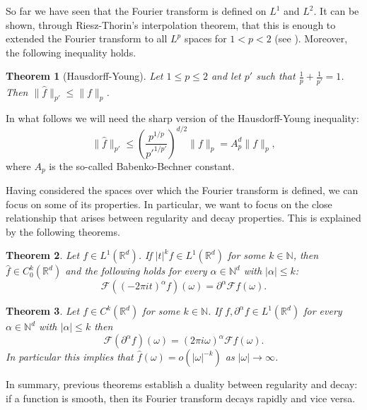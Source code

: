 \documentclass[corpo=11pt, stile=classica, tipotesi=custom,
greek, evenboxes, english]{toptesi}
\numberwithin{equation}{chapter}
\newtheorem{teo}{Theorem}[chapter] %
\theoremstyle{definition}
\theoremstyle{remark}
\newcommand{\R}{\mathbb{R}} %
\newcommand{\N}{\mathbb{N}} %
\newcommand{\F}{\mathscr{F}} %
\begin{document}
So far we have seen that the Fourier transform is defined on $L^1$ and $L^2$. It can be shown, through Riesz-Thorin's interpolation theorem, that this is enough to extended the Fourier transform to all $L^p$ spaces for $1 < p < 2$ (see \cite[][Section 2.2.4]{grafakos}). Moreover, the following inequality holds.
\begin{teo}[Hausdorff-Young]
	Let $1 \leq p \leq 2$ and let $p'$ such that $\frac{1}{p} + \frac{1}{p'} = 1$. Then $\| \hat{f }\|_{p'} \leq \| f \|_p$.
\end{teo}
In what follows we will need the sharp version of the Hausdorff-Young inequality: 
\begin{equation}\label{Hausdorff-Yound inequality}
	\| \hat{f} \|_{p'} \leq \left(\dfrac{p^{1/p}}{p'^{1/p'}}\right)^{d/2} \|f\|_p = A_p^d \|f\|_p,
\end{equation}
where $A_p$ is the so-called Babenko-Bechner constant.

Having considered the spaces over which the Fourier transform is defined, we can focus on some of its properties. In particular, we want to focus on the close relationship that arises between regularity and decay properties. This is explained by the following theorems.
\begin{teo}\label{duality decay-regularity theorem}
	Let $f \in L^1(\R^d)$. If $|t|^k f \in L^1(\R^d)$ for some $k \in \N$, then $\hat{f} \in C_0^k(\R^d)$ and the following holds for every $\alpha \in \N^d$ with $|\alpha| \leq k$:
	\begin{equation}\label{derivative of transform}
		\F \left((-2 \pi i t)^{\alpha} f \right) (\omega) = \partial^{\alpha} \F f(\omega).
	\end{equation}
\end{teo}
\begin{teo}\label{duality regularity-decay theorem}
	Let $f \in C^k(\R^d)$ for some $k \in \N$. If $f, \partial^{\alpha}f \in L^1(\R^d)$ for every $\alpha \in \N^d$ with $|\alpha| \leq k$ then
	\begin{equation}\label{transform of derivative}
		\F \left(\partial^{\alpha} f\right) (\omega) = \left(2 \pi i \omega\right)^{\alpha} \F f(\omega).
	\end{equation}
	In particular this implies that $\hat{f}(\omega) = o\left(|\omega|^{-k} \right) $ as $| \omega | \rightarrow \infty$.
\end{teo}
In summary, previous theorems establish a duality between regularity and decay: if a function is smooth, then its Fourier transform decays rapidly and vice versa.
\end{document}
